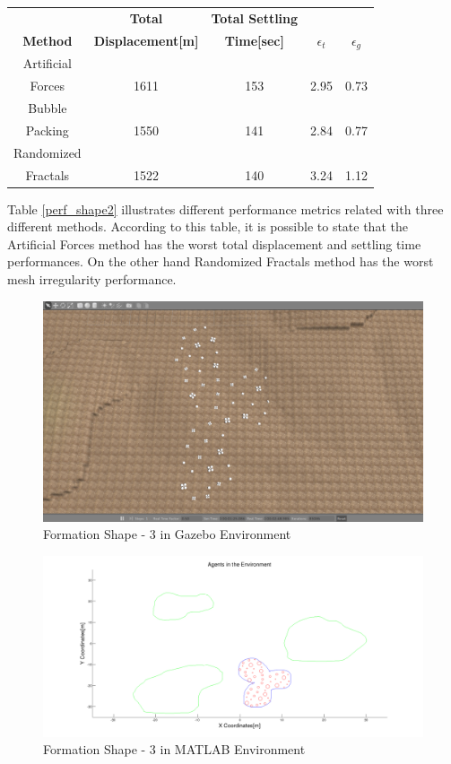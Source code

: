 		 
\begin{center}
 \label{perf_shape2} 
\begin{tabular}{|c|c|c|c|c|}
					
\hline
\textbf{} & \textbf{Total}  & \textbf{Total Settling} & \textbf{} & \textbf{} \\ \textbf{Method} & \textbf{Displacement[m]} & \textbf{Time[sec]}& \textbf{$\epsilon_t$} & \textbf{$\epsilon_g$} \\
\hline
Artificial&  &  &  & \\
 Forces & 1611 & 153& 2.95 & 0.73\\
 \hline
 Bubble&  &  &  & \\
 Packing &1550 &141 &2.84 & 0.77\\
\hline
 Randomized&  &  &  & \\
 Fractals &1522 &140 &3.24 & 1.12\\
\hline
\end{tabular}
\end{center}
		 		
Table \ref{perf_shape2} illustrates different performance metrics related with three different methods. According to this table, it is possible to state that the Artificial Forces method has the worst total displacement and settling time performances. On the other hand Randomized Fractals method has the worst mesh irregularity performance.
		 
\begin{figure}[H]
\caption{Formation Shape - 3 in Gazebo Environment}
\centerline{\includegraphics[scale = 0.32]{3_Gazebo}}
\end{figure} 
				 
\begin{figure}[H]
\caption{Formation Shape - 3 in MATLAB Environment}
\centerline{\includegraphics[scale = 0.32]{3}}
\end{figure} 			 

